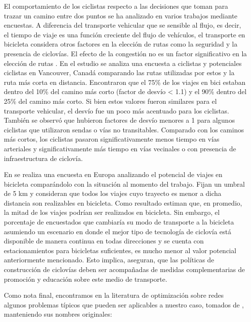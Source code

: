 \documentclass{article}
\begin{document}

  El comportamiento de los ciclistas respecto a las decisiones que toman para trazar un camino entre dos puntos se ha analizado en varios trabajos mediante encuestas. A diferencia del transporte vehicular que se sensible al flujo, es decir, el tiempo de viaje es una función creciente del flujo de vehículos, el transporte en bicicleta considera otros factores en la elección de rutas como la seguridad y la presencia de ciclovías. El efecto de la congestión no es un factor significativo en la elección de rutas \cite{broach2012}. En el estudio \cite{winters2010} se analiza una encuesta a ciclistas y potenciales ciclistas en Vancouver, Canadá comparando las rutas utilizadas por estos y la ruta más corta en distancia. Encontraron que el 75\% de los viajes en bici estaban dentro del 10\% del camino más corto (factor de desvío < 1.1) y el 90\% dentro del 25\% del camino más corto. Si bien estos valores fueron similares para el transporte vehicular, el desvío fue un poco más acentuado para los ciclistas. También se observó que hubieron factores de desvío menores a 1 para algunos ciclistas que utilizaron sendas o vías no transitables. Comparado con los caminos más cortos, los ciclistas pasaron significativamente menos tiempo en vías arteriales y significativamente más tiempo en vías vecinales o con presencia de infraestructura de ciclovía.

  En \cite{shwe2014} se realiza una encuesta en Europa analizando el potencial de viajes en bicicleta comparándolo con la situación al momento del trabajo. Fijan un umbral de 5 km y consideran que todos los viajes cuyo trayecto es menor a dicha distancia son realizables en bicicleta. Como resultado estiman que, en promedio, la mitad de los viajes podrían ser realizados en bicicleta. Sin embargo, el porcentaje de encuestados que cambiaría su modo de transporte a la bicicleta asumiendo un escenario en donde el mejor tipo de tecnología de ciclovía está disponible de manera continua en todas direcciones y se cuenta con estacionamientos para bicicletas suficientes, es mucho menor al valor potencial anteriormente mencionado. Esto implica, aseguran, que las políticas de construcción de ciclovías deben ser acompañadas de medidas complementarias de promoción y educación sobre este medio de transporte.


  Como nota final, encontramos en la literatura de optimización sobre redes algunos problemas típicos que pueden ser aplicables a nuestro caso, tomados de \cite{Crainic2021}, manteniendo sus nombres originales:
\end{document}
